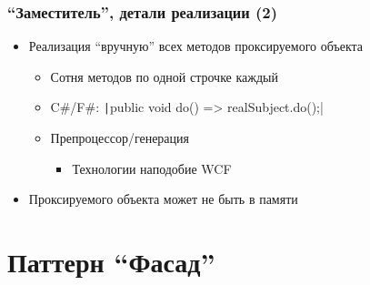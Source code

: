 \documentclass{../../slides-style}
\begin{document}
    \begin{frame}
        \frametitle{``Заместитель'', детали реализации (2)}
        \begin{itemize}
            \item Реализация ``вручную'' всех методов проксируемого объекта
            \begin{itemize}
                \item Сотня методов по одной строчке каждый
                \item C\#/F\#: \texttt|public void do() => realSubject.do();|
                \item Препроцессор/генерация
                \begin{itemize}
                    \item Технологии наподобие WCF
                \end{itemize}
            \end{itemize}
            \item Проксируемого объекта может не быть в памяти
        \end{itemize}
    \end{frame}

    \section{Паттерн ``Фасад''}
\end{document}
